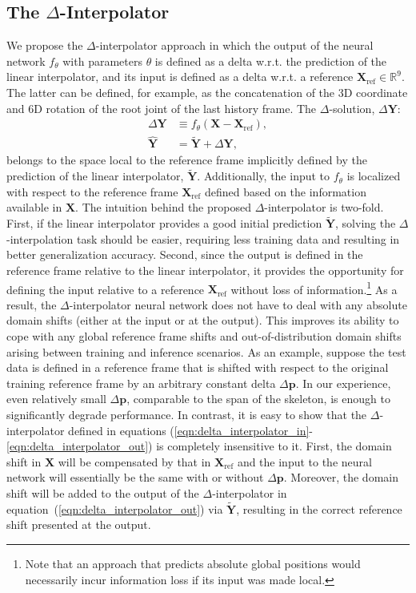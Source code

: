 \documentclass[letterpaper]{article} \usepackage[]{aaai23}  \usepackage{times}  \usepackage{helvet}  \usepackage{courier}  \usepackage[hyphens]{url}  \usepackage{graphicx} \urlstyle{rm} \def\UrlFont{\rm}  \usepackage{natbib}  \usepackage{caption} \frenchspacing  \setlength{\pdfpagewidth}{8.5in} \setlength{\pdfpageheight}{11in}
\renewcommand{\vec}[1]{\mathbf{#1}}
\renewcommand{\Re}{\mathbb{R}}
\begin{document}
\subsection{The $\Delta$-Interpolator}

We propose the $\Delta$-interpolator approach in which the output of the neural network $f_{\theta}$ with parameters $\theta$ is defined as a delta w.r.t. the prediction of the linear interpolator, and its input is defined as a delta w.r.t. a reference $\vec{X}_{\textrm{ref}} \in \Re^{9}$. The latter can be defined, for example, as the concatenation of the 3D coordinate and 6D rotation of the root joint of the last history frame. The $\Delta$-solution, $\Delta\vec{Y}$:
\begin{align} 
\Delta\vec{Y} &\equiv f_{\theta}(\vec{X} - \vec{X}_{\textrm{ref}}), \label{eqn:delta_interpolator_in} \\
\widehat{\vec{Y}} &= \widetilde{\vec{Y}} + \Delta\vec{Y} \label{eqn:delta_interpolator_out},
\end{align}
belongs to the space local to the reference frame implicitly defined by the prediction of the linear interpolator, $\widetilde{\vec{Y}}$. Additionally, the input to $f_{\theta}$ is localized with respect to the reference frame $\vec{X}_{\textrm{ref}}$ defined based on the information available in $\vec{X}$. The intuition behind the proposed $\Delta$-interpolator is two-fold. First, if the linear interpolator provides a good initial prediction $\widetilde{\vec{Y}}$, solving the $\Delta$-interpolation task should be easier, requiring less training data and resulting in better generalization accuracy. Second, since the output is defined in the reference frame relative to the linear interpolator, it provides the opportunity for defining the input relative to a reference $\vec{X}_{\textrm{ref}}$ without loss of information.\footnote{Note that an approach that predicts absolute global positions would necessarily incur information loss if its input was made local.} As a result, the $\Delta$-interpolator neural network does not have to deal with any absolute domain shifts (either at the input or at the output). This improves its ability to cope with any global reference frame shifts and out-of-distribution domain shifts arising between training and inference scenarios. As an example, suppose the test data is defined in a reference frame that is shifted with respect to the original training reference frame by an arbitrary constant delta $\Delta \vec{p}$. In our experience, even relatively small $\Delta \vec{p}$, comparable to the span of the skeleton, is enough to significantly degrade performance. In contrast, it is easy to show that the $\Delta$-interpolator defined in equations (\ref{eqn:delta_interpolator_in}-\ref{eqn:delta_interpolator_out}) is completely insensitive to it. First, the domain shift in $\vec{X}$ will be compensated by that in $\vec{X}_{\textrm{ref}}$ and the input to the neural network will essentially be the same with or without $\Delta \vec{p}$. Moreover, the domain shift will be added  to the output of the $\Delta$-interpolator in equation~(\ref{eqn:delta_interpolator_out}) via $\widetilde{\vec{Y}}$, resulting in the correct reference shift presented at the output.
\end{document}
